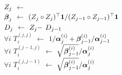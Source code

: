 \begin{algorithm2e}[p!]
{      \\
      {\color{\colormat} }
      {\color{\colormat} $Z_{j}$ $\gets$ }
      \\
      {\color{\colormat} $\boldsymbol{\beta}_j$ $\gets$ ${( Z_{j} \circ Z_{j} )^\top \mathbf 1}/{( Z_{j-1} \circ Z_{j-1} )^\top \mathbf 1}$}
      \\
      {\color{\colormat} $D_{j}$ $\gets$ $Z_{j} -$  $D_{j-1}$}
      \\
      {\color{\colornew} $\forall i$ \: $T_{i}^{(j,j)}$ $\gets$ $1/\boldsymbol{\alpha}_{j}^{(i)} + \boldsymbol{\beta}_{j-1}^{(i)}/\boldsymbol{\alpha}_{j-1}^{(i)}$}
      \\
      {\color{\colornew} $\forall i$ \: $T_{i}^{(j-1,j)}$ $\gets$ $\sqrt{\boldsymbol{\beta}_{j-1}^{(i)}}/\boldsymbol{\alpha}_{j}^{(i)}$}
			\\
      {\color{\colornew} $\forall i$ \: $T_{i}^{(j,j-1)}$ $\gets$ $\sqrt{\boldsymbol{\beta}_{j-1}^{(i)}}/\boldsymbol{\alpha}_{j}^{(i)}$}
    }
\end{algorithm2e}
